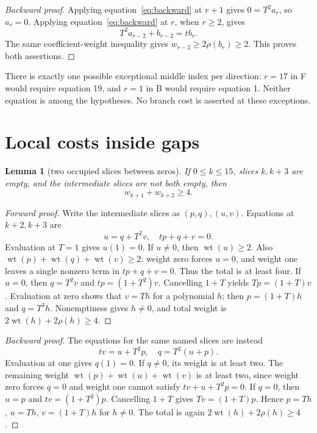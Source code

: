 \documentclass{article}
\newtheorem{lemma}{Lemma}
\DeclareMathOperator{\wt}{wt}
\begin{document}
\begin{proof}[Backward proof]
  Applying equation~\eqref{eq:backward} at \(r + 1\) gives \(0 = T^2 a_r\), so \(a_r = 0\).
  Applying equation~\eqref{eq:backward} at \(r\), when \(r \ge 2\), gives
  \begin{equation}
    T^2 a_{r-2} + b_{r-2} = t b_r.
  \end{equation}
  The same coefficient-weight inequality gives \(w_{r-2} \ge 2\rho(b_r) \ge 2\). This proves both
  assertions.
\end{proof}

There is exactly one possible exceptional middle index per direction: \(r = 17\) in F would
require equation 19, and \(r = 1\) in B would require equation 1. Neither equation is among the
hypotheses. No branch cost is asserted at these exceptions.

\section{Local costs inside gaps}\label{sec:gaps}

\begin{lemma}[two occupied slices between zeros]\label{lem:two}
  If \(0 \le k \le 15\), slices \(k, k + 3\) are empty, and the intermediate slices are not both
  empty, then
  \begin{equation}
    w_{k+1} + w_{k+2} \ge 4.
  \end{equation}
\end{lemma}

\begin{proof}[Forward proof]
  Write the intermediate slices as \((p,q), (u,v)\). Equations at \(k + 2, k + 3\) are
  \begin{equation}
    u = q + T^2 v, \quad tp + q + v = 0.
  \end{equation}
  Evaluation at \(T = 1\) gives \(u(1) = 0\). If \(u \ne 0\), then \(\wt(u) \ge 2\). Also
  \(\wt(p) + \wt(q) + \wt(v) \ge 2\): weight zero forces \(u = 0\), and weight one leaves a single
  nonzero term in \(tp + q + v = 0\). Thus the total is at least four. If \(u = 0\), then
  \(q = T^2 v\) and \(tp = (1 + T^2)v\). Cancelling \(1 + T\) yields \(Tp = (1 + T)v\). Evaluation
  at zero shows that \(v = Th\) for a polynomial \(h\); then \(p = (1 + T)h\) and \(q = T^3 h\).
  Nonemptiness gives \(h \ne 0\), and total weight is \(2\wt(h) + 2\rho(h) \ge 4\).
\end{proof}

\begin{proof}[Backward proof]
  The equations for the same named slices are instead
  \begin{equation}
    tv = u + T^2 p, \quad q = T^2 (u + p).
  \end{equation}
  Evaluation at one gives \(q(1) = 0\). If \(q \ne 0\), its weight is at least two. The remaining
  weight \(\wt(p) + \wt(u) + \wt(v)\) is at least two, since weight zero forces \(q = 0\) and
  weight one cannot satisfy \(tv + u + T^2 p = 0\). If \(q = 0\), then \(u = p\) and
  \(tv = (1 + T^2)p\). Cancelling \(1 + T\) gives \(Tv = (1 + T)p\). Hence \(p = Th\), \(u = Th\),
  \(v = (1 + T)h\) for \(h \ne 0\). The total is again \(2\wt(h) + 2\rho(h) \ge 4\).
\end{proof}
\end{document}
